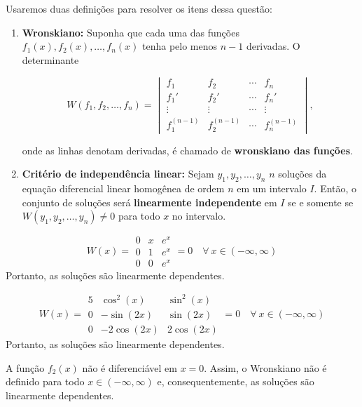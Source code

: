 \documentclass[oneside,12pt,a4paper]{report}
\begin{document}
\begin{resolucao}
    Usaremos duas definições para resolver os itens dessa questão:
    \begin{enumerate}
        \item \textbf{Wronskiano:} Suponha que cada uma das funções $f_1(x), f_2(x), \ldots, f_n(x)$ tenha
        pelo menos $n - 1$ derivadas. O determinante

        $$W(f_1, f_2, \ldots, f_n) =
        \begin{vmatrix}
        f_1            & f_2            & \cdots & f_n            \\
        f_1'           & f_2'           & \cdots & f_n'           \\
        \vdots         & \vdots         & \cdots & \vdots         \\
        f_1^{(n-1)}    & f_2^{(n-1)}    & \cdots & f_n^{(n-1)}
        \end{vmatrix},$$

        onde as linhas denotam derivadas, é chamado de \textbf{wronskiano das funções}.

        \item \textbf{Critério de independência linear:} Sejam $y_1, y_2, \ldots, y_n$ $n$ soluções da equação diferencial linear
        homogênea de ordem $n$ em um intervalo $I$. Então, o conjunto de soluções
        será \textbf{linearmente independente} em $I$ se e somente se
        $W(y_1, y_2, \ldots, y_n) \neq 0$ para todo $x$ no intervalo.
    \end{enumerate}

    \itemresolucao 
    \[W(x)=\begin{array}{|ccc|}
        0 & x & e^x\\
        0 & 1 & e^x\\
        0 & 0 & e^x
    \end{array}=0\quad\forall~x\in(-\infty, \infty)\]
    Portanto, as soluções são linearmente dependentes.

    \itemresolucao 
    \[W(x)=\begin{array}{|ccc|}
        5 & \cos^2(x) & \sin^2(x)\\
        0 & -\sin(2x) & \sin(2x)\\
        0 & -2\cos(2x) & 2\cos(2x)
    \end{array}=0\quad\forall~x\in(-\infty, \infty)\]
    Portanto, as soluções são linearmente dependentes.

    \itemresolucao A função $f_2(x)$ não é diferenciável em $x=0$. Assim, o Wronskiano não é definido para todo $x\in(-\infty, \infty)$ e, consequentemente, as soluções são linearmente dependentes.


\end{resolucao}
\end{document}

